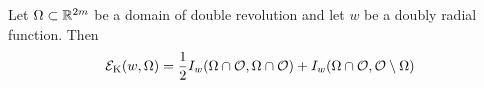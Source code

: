 %

\begin{lemma}
Let $\Omega\subset \mathbb{R}^{2m}$ be a domain of double revolution and let $w$ be a doubly radial
function. Then
\begin{align*}
\label{Eq:EnergyOddInOcal2}
\mathcal{E}_\mathrm{K}(w, \Omega) = \frac{1}{2} I_w(\Omega\cap\mathcal{O},\Omega\cap\mathcal{O}) + I_w(\Omega\cap\mathcal{O},\mathcal{O}\setminus\Omega)
\end{align*}
\end{lemma}

